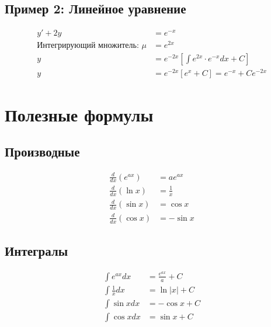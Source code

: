 \documentclass[10pt,landscape,a4paper]{article}
\begin{document}
\begin{multicols}{2}
\subsection{Пример 2: Линейное уравнение}
\begin{align}
    y' + 2y &= e^{-x} \\
    \text{Интегрирующий множитель: } \mu &= e^{2x} \\
    y &= e^{-2x}\left[\int e^{2x} \cdot e^{-x} dx + C\right] \\
    y &= e^{-2x}\left[e^x + C\right] = e^{-x} + Ce^{-2x}
\end{align}

\section{Полезные формулы}

\subsection{Производные}
\begin{align}
    \frac{d}{dx}(e^{ax}) &= ae^{ax} \\
    \frac{d}{dx}(\ln x) &= \frac{1}{x} \\
    \frac{d}{dx}(\sin x) &= \cos x \\
    \frac{d}{dx}(\cos x) &= -\sin x
\end{align}

\subsection{Интегралы}
\begin{align}
    \int e^{ax} dx &= \frac{e^{ax}}{a} + C \\
    \int \frac{1}{x} dx &= \ln|x| + C \\
    \int \sin x dx &= -\cos x + C \\
    \int \cos x dx &= \sin x + C
\end{align}

\end{multicols}
\end{document}
